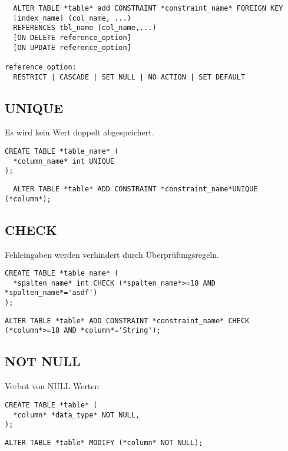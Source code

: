\begin{lstlisting}
  ALTER TABLE *table* add CONSTRAINT *constraint_name* FOREIGN KEY
  [index_name] (col_name, ...)
  REFERENCES tbl_name (col_name,...)
  [ON DELETE reference_option]
  [ON UPDATE reference_option]

reference_option:
  RESTRICT | CASCADE | SET NULL | NO ACTION | SET DEFAULT

\end{lstlisting}

\subsection{UNIQUE}
Es wird kein Wert doppelt abgespeichert.

\begin{lstlisting}
CREATE TABLE *table_name* (
  *column_name* int UNIQUE
);
\end{lstlisting}


\begin{lstlisting}
  ALTER TABLE *table* ADD CONSTRAINT *constraint_name*UNIQUE (*column*);
\end{lstlisting}

\subsection{CHECK}

Fehleingaben werden verhindert durch Überprüfungsregeln.

\begin{lstlisting}
CREATE TABLE *table_name* (
  *spalten_name* int CHECK (*spalten_name*>=18 AND *spalten_name*='asdf')
);
\end{lstlisting}


\begin{lstlisting}
ALTER TABLE *table* ADD CONSTRAINT *constraint_name* CHECK (*column*>=18 AND *column*='String');
\end{lstlisting}

\subsection{NOT NULL}

Verbot von NULL Werten

\begin{lstlisting}
CREATE TABLE *table* (
  *column* *data_type* NOT NULL,
);
\end{lstlisting}


\begin{lstlisting}
ALTER TABLE *table* MODIFY (*column* NOT NULL);
\end{lstlisting}

